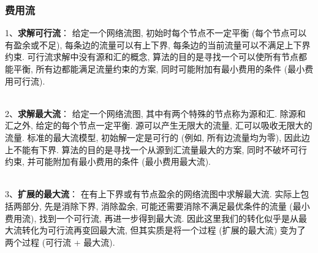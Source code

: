 \subsubsection{费用流}
1、\textbf{求解可行流}： 给定一个网络流图, 初始时每个节点不一定平衡 (每个节点可以有盈余或不足), 每条边的流量可以有上下界, 每条边的当前流量可以不满足上下界约束. 可行流求解中没有源和汇的概念, 算法的目的是寻找一个可以使所有节点都能平衡, 所有边都能满足流量约束的方案, 同时可能附加有最小费用的条件 (最小费用可行流).\par
~\\

2、\textbf{求解最大流}： 给定一个网络流图, 其中有两个特殊的节点称为源和汇. 除源和汇之外, 给定的每个节点一定平衡. 源可以产生无限大的流量, 汇可以吸收无限大的流量. 标准的最大流模型, 初始解一定是可行的 (例如, 所有边流量均为零), 因此边上不能有下界. 算法的目的是寻找一个从源到汇流量最大的方案, 同时不破坏可行约束, 并可能附加有最小费用的条件 (最小费用最大流). \par
~\\
3、\textbf{扩展的最大流}： 在有上下界或有节点盈余的网络流图中求解最大流. 实际上包括两部分, 先是消除下界, 消除盈余, 可能还需要消除不满足最优条件的流量 (最小费用流), 找到一个可行流, 再进一步得到最大流. 因此这里我们的转化似乎是从最大流转化为可行流再变回最大流, 但其实质是将一个过程 (扩展的最大流) 变为了两个过程 (可行流 + 最大流).\par

